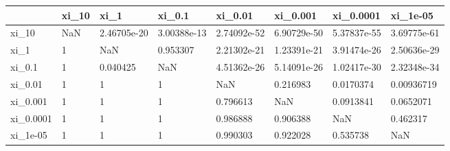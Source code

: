 \begin{tabular}{llllllll}
\toprule
{} & xi\_10 &         xi\_1 &       xi\_0.1 &      xi\_0.01 &     xi\_0.001 &    xi\_0.0001 &     xi\_1e-05 \\
\midrule
xi\_10     &   NaN &  2.46705e-20 &  3.00388e-13 &  2.74092e-52 &  6.90729e-50 &  5.37837e-55 &  3.69775e-61 \\
xi\_1      &     1 &          NaN &     0.953307 &  2.21302e-21 &  1.23391e-21 &  3.91474e-26 &  2.50636e-29 \\
xi\_0.1    &     1 &     0.040425 &          NaN &  4.51362e-26 &  5.14091e-26 &  1.02417e-30 &  2.32348e-34 \\
xi\_0.01   &     1 &            1 &            1 &          NaN &     0.216983 &    0.0170374 &   0.00936719 \\
xi\_0.001  &     1 &            1 &            1 &     0.796613 &          NaN &    0.0913841 &    0.0652071 \\
xi\_0.0001 &     1 &            1 &            1 &     0.986888 &     0.906388 &          NaN &     0.462317 \\
xi\_1e-05  &     1 &            1 &            1 &     0.990303 &     0.922028 &     0.535738 &          NaN \\
\bottomrule
\end{tabular}
